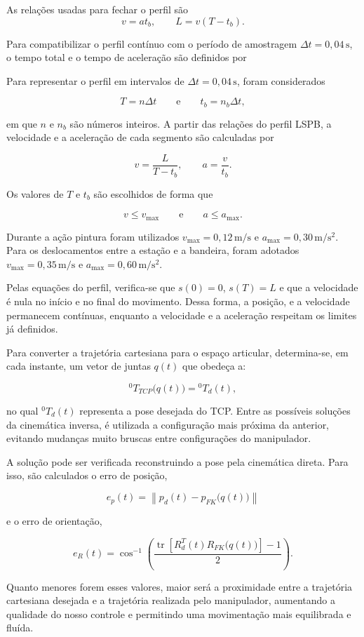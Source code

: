 As relações usadas para fechar o perfil são
\begin{equation}
v=a t_b,
\qquad
L=v(T-t_b).
\label{eq:lspb_relacoes}
\end{equation}

Para compatibilizar o perfil contínuo com o período de amostragem \(\Delta t=0{,}04\,\mathrm{s}\), o tempo total e o tempo de aceleração são definidos por

Para representar o perfil em intervalos de \(\Delta t=0{,}04\,\mathrm{s}\), foram considerados

\[
T=n\Delta t
\qquad \text{e} \qquad
t_b=n_b\Delta t,
\]

em que \(n\) e \(n_b\) são números inteiros. A partir das relações do perfil LSPB, a velocidade e a aceleração de cada segmento são calculadas por

\[
v=\frac{L}{T-t_b},
\qquad
a=\frac{v}{t_b}.
\]

Os valores de \(T\) e \(t_b\) são escolhidos de forma que

\[
v\leq v_{\max}
\qquad \text{e} \qquad
a\leq a_{\max}.
\]

Durante a ação pintura foram utilizados \(v_{\max}=0{,}12\,\mathrm{m/s}\) e \(a_{\max}=0{,}30\,\mathrm{m/s^2}\). Para os deslocamentos entre a estação e a bandeira, foram adotados \(v_{\max}=0{,}35\,\mathrm{m/s}\) e \(a_{\max}=0{,}60\,\mathrm{m/s^2}\).

Pelas equações do perfil, verifica-se que \(s(0)=0\), \(s(T)=L\) e que a velocidade é nula no início e no final do movimento. Dessa forma, a posição, e a velocidade permanecem contínuas, enquanto a velocidade e a aceleração respeitam os limites já definidos.

Para converter a trajetória cartesiana para o espaço articular, determina-se, em cada instante, um vetor de juntas \(q(t)\) que obedeça a:

\[
{}^{0}T_{TCP}\bigl(q(t)\bigr)={}^0T_d(t),
\]

no qual \({}^0T_d(t)\) representa a pose desejada do TCP. Entre as possíveis soluções da cinemática inversa, é utilizada a configuração mais próxima da anterior, evitando mudanças muito bruscas entre configurações do manipulador.

A solução pode ser verificada reconstruindo a pose pela cinemática direta. Para isso, são calculados o erro de posição,

\[
e_p(t)=
\left\|
p_d(t)-p_{FK}\bigl(q(t)\bigr)
\right\|
\]

e o erro de orientação,

\[
e_R(t)=
\cos^{-1}
\left(
\frac{
\operatorname{tr}\!\left[R_d^T(t)R_{FK}\bigl(q(t)\bigr)\right]-1
}{2}
\right).
\]

Quanto menores forem esses valores, maior será a proximidade entre a trajetória cartesiana desejada e a trajetória realizada pelo manipulador, aumentando a qualidade do nosso controle e permitindo uma movimentação mais equilibrada e fluída.